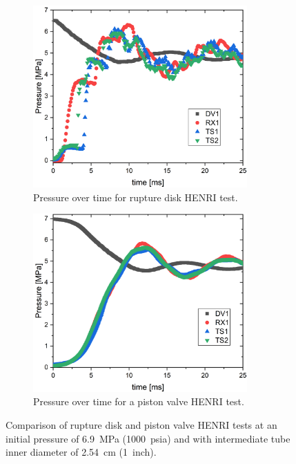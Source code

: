 \begin{figure}[htbp]
    \vspace{16pt}
    \centering
    \begin{subfigure}[t]{0.45\textwidth}
        \centering
        \includegraphics[width=0.9\textwidth]{results/plots/940psi-BD-1.png}
        \caption{Pressure over time for rupture disk HENRI test.}
        \label{fig:disk}
    \end{subfigure}
    \hfill
    \begin{subfigure}[t]{0.45\textwidth}
        \centering
        \includegraphics[width=0.9\textwidth]{results/plots/1000psi_mtM_Co.png}
        \caption{Pressure over time for a piston valve HENRI test.}
        \label{fig:piston metal 1000psi}
    \end{subfigure}
    
    \caption{Comparison of rupture disk and piston valve HENRI tests at an initial pressure of \SI{6.9}{\mega\pascal} (\SI{1000}{psia}) and with intermediate tube inner diameter of \SI{2.54}{\centi\meter} (\SI{1}{inch}).}
    \label{fig:piston v disk}
    \vspace{16pt}
\end{figure}




